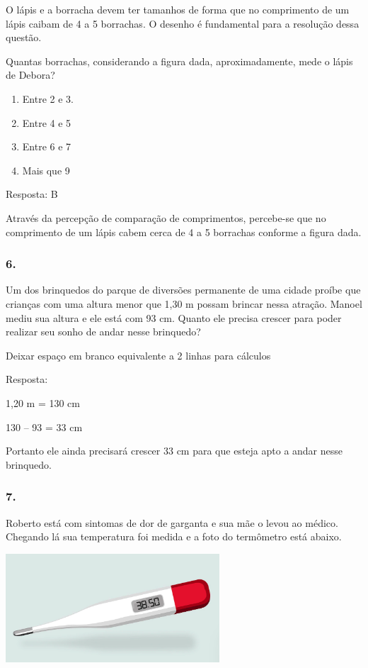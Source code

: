 O lápis e a borracha devem ter tamanhos de forma que no comprimento de
um lápis caibam de 4 a 5 borrachas. O desenho é fundamental para a
resolução dessa questão.

Quantas borrachas, considerando a figura dada, aproximadamente, mede o
lápis de Debora?

\begin{enumerate}
\def\labelenumi{\alph{enumi})}
\item
  Entre 2 e 3.
\item
  Entre 4 e 5
\item
  Entre 6 e 7
\item
  Mais que 9
\end{enumerate}

Resposta: B

Através da percepção de comparação de comprimentos, percebe-se que no
comprimento de um lápis cabem cerca de 4 a 5 borrachas conforme a figura
dada.

\subsubsection{6. }\label{section-56}

Um dos brinquedos do parque de diversões permanente de uma cidade proíbe
que crianças com uma altura menor que 1,30 m possam brincar nessa
atração. Manoel mediu sua altura e ele está com 93 cm. Quanto ele
precisa crescer para poder realizar seu sonho de andar nesse brinquedo?

Deixar espaço em branco equivalente a 2 linhas para cálculos

Resposta:

1,20 m = 130 cm

130 -- 93 = 33 cm

Portanto ele ainda precisará crescer 33 cm para que esteja apto a andar
nesse brinquedo.

\subsubsection{7. }\label{section-57}

Roberto está com sintomas de dor de garganta e sua mãe o levou ao
médico. Chegando lá sua temperatura foi medida e a foto do termômetro
está abaixo.

\includegraphics[width=3.15000in,height=1.59426in]{media/image47.png}


